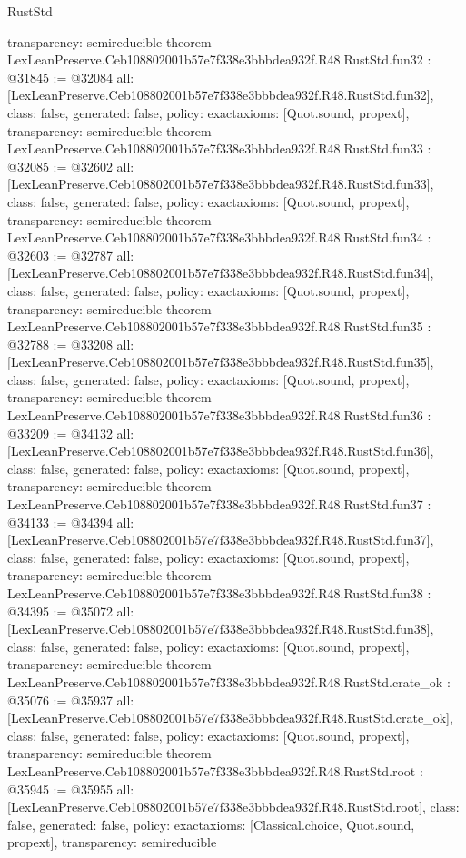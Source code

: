 \begin{lexlean}{RustStd}
\begin{coremodule}
{  transparency: semireducible
}
theorem LexLeanPreserve.Ceb108802001b57e7f338e3bbbdea932f.R48.RustStd.fun32 : @31845 := @32084 {
  all: [LexLeanPreserve.Ceb108802001b57e7f338e3bbbdea932f.R48.RustStd.fun32],
  class: false,
  generated: false,
  policy: exact{axioms: [Quot.sound, propext]},
  transparency: semireducible
}
theorem LexLeanPreserve.Ceb108802001b57e7f338e3bbbdea932f.R48.RustStd.fun33 : @32085 := @32602 {
  all: [LexLeanPreserve.Ceb108802001b57e7f338e3bbbdea932f.R48.RustStd.fun33],
  class: false,
  generated: false,
  policy: exact{axioms: [Quot.sound, propext]},
  transparency: semireducible
}
theorem LexLeanPreserve.Ceb108802001b57e7f338e3bbbdea932f.R48.RustStd.fun34 : @32603 := @32787 {
  all: [LexLeanPreserve.Ceb108802001b57e7f338e3bbbdea932f.R48.RustStd.fun34],
  class: false,
  generated: false,
  policy: exact{axioms: [Quot.sound, propext]},
  transparency: semireducible
}
theorem LexLeanPreserve.Ceb108802001b57e7f338e3bbbdea932f.R48.RustStd.fun35 : @32788 := @33208 {
  all: [LexLeanPreserve.Ceb108802001b57e7f338e3bbbdea932f.R48.RustStd.fun35],
  class: false,
  generated: false,
  policy: exact{axioms: [Quot.sound, propext]},
  transparency: semireducible
}
theorem LexLeanPreserve.Ceb108802001b57e7f338e3bbbdea932f.R48.RustStd.fun36 : @33209 := @34132 {
  all: [LexLeanPreserve.Ceb108802001b57e7f338e3bbbdea932f.R48.RustStd.fun36],
  class: false,
  generated: false,
  policy: exact{axioms: [Quot.sound, propext]},
  transparency: semireducible
}
theorem LexLeanPreserve.Ceb108802001b57e7f338e3bbbdea932f.R48.RustStd.fun37 : @34133 := @34394 {
  all: [LexLeanPreserve.Ceb108802001b57e7f338e3bbbdea932f.R48.RustStd.fun37],
  class: false,
  generated: false,
  policy: exact{axioms: [Quot.sound, propext]},
  transparency: semireducible
}
theorem LexLeanPreserve.Ceb108802001b57e7f338e3bbbdea932f.R48.RustStd.fun38 : @34395 := @35072 {
  all: [LexLeanPreserve.Ceb108802001b57e7f338e3bbbdea932f.R48.RustStd.fun38],
  class: false,
  generated: false,
  policy: exact{axioms: [Quot.sound, propext]},
  transparency: semireducible
}
theorem LexLeanPreserve.Ceb108802001b57e7f338e3bbbdea932f.R48.RustStd.crate_ok : @35076 := @35937 {
  all: [LexLeanPreserve.Ceb108802001b57e7f338e3bbbdea932f.R48.RustStd.crate_ok],
  class: false,
  generated: false,
  policy: exact{axioms: [Quot.sound, propext]},
  transparency: semireducible
}
theorem LexLeanPreserve.Ceb108802001b57e7f338e3bbbdea932f.R48.RustStd.root : @35945 := @35955 {
  all: [LexLeanPreserve.Ceb108802001b57e7f338e3bbbdea932f.R48.RustStd.root],
  class: false,
  generated: false,
  policy: exact{axioms: [Classical.choice, Quot.sound, propext]},
  transparency: semireducible
}


\end{coremodule}
\end{lexlean}
